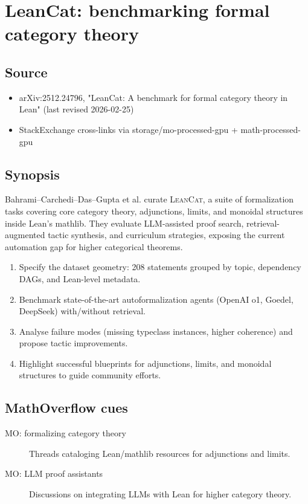 \section*{LeanCat: benchmarking formal category theory}
\subsection*{Source}
\begin{itemize}
  \item arXiv:2512.24796, "LeanCat: A benchmark for formal category theory in Lean" (last revised 2026-02-25)
  \item StackExchange cross-links via storage/mo-processed-gpu + math-processed-gpu
\end{itemize}
\subsection*{Synopsis}
Bahrami--Carchedi--Das--Gupta et al. curate \textsc{LeanCat}, a suite of formalization tasks covering core category theory, adjunctions, limits, and monoidal structures inside Lean's mathlib. They evaluate LLM-assisted proof search, retrieval-augmented tactic synthesis, and curriculum strategies, exposing the current automation gap for higher categorical theorems.
\begin{enumerate}
  \item Specify the dataset geometry: 208 statements grouped by topic, dependency DAGs, and Lean-level metadata.
  \item Benchmark state-of-the-art autoformalization agents (OpenAI o1, Goedel, DeepSeek) with/without retrieval.
  \item Analyse failure modes (missing typeclass instances, higher coherence) and propose tactic improvements.
  \item Highlight successful blueprints for adjunctions, limits, and monoidal structures to guide community efforts.
\end{enumerate}
\subsection*{MathOverflow cues}
\begin{description}
  \item[MO: formalizing category theory] Threads cataloging Lean/mathlib resources for adjunctions and limits.
  \item[MO: LLM proof assistants] Discussions on integrating LLMs with Lean for higher category theory.
\end{description}
